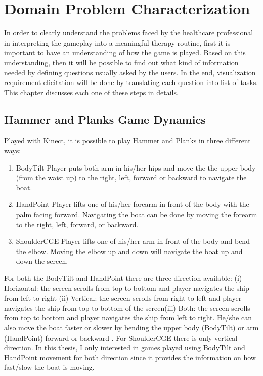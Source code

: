 \chapter{Domain Problem Characterization}
\label{chap:problem}

In order to clearly understand the problems faced by the healthcare professional in interpreting the gameplay into a meaningful therapy routine, first it is important to have an understanding of how the game is played. Based on this understanding, then it will be possible to find out what kind of information needed by defining questions usually asked by the users. In the end, visualization requirement elicitation will be done by translating each question into list of tasks. This chapter discusses each one of these steps in details.

\section{Hammer and Planks Game Dynamics}

Played with Kinect, it is possible to play Hammer and Planks in three different ways:
\begin{enumerate}
  \item BodyTilt
  Player puts both arm in his/her hips and move the the upper body (from the waist up) to the right, left, forward or backward to navigate the boat. 
  \item HandPoint
  Player lifts one of his/her forearm in front of the body with the palm facing forward. Navigating the boat can be done by moving the forearm to the right, left, forward, or backward.
  \item ShoulderCGE
  Player lifts one of his/her arm in front of the body and bend the elbow. Moving the elbow up and down will navigate the boat up and down the screen.
\end{enumerate}

For both the BodyTilt and HandPoint there are three direction available: (i) Horizontal: the screen scrolls from top to bottom and player navigates the ship from left to right (ii) Vertical: the screen scrolls from right to left and player navigates the ship from top to bottom of the screen(iii) Both: the screen scrolls from top to bottom and player navigates the ship from left to right. He/she can also move the boat faster or slower by bending the upper body (BodyTilt) or arm (HandPoint) forward or backward . For ShoulderCGE there is only vertical direction. In this thesis, I only interested in games played using BodyTilt and HandPoint movement for both direction since it provides the information on how fast/slow the boat is moving.

